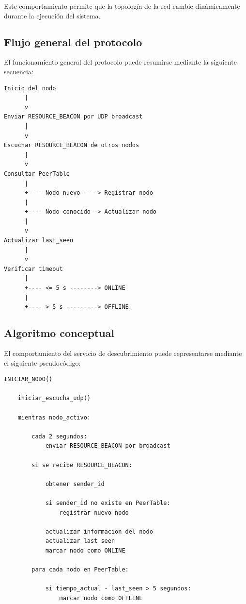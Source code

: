 \documentclass{article}
\begin{document}
Este comportamiento permite que la topología de la red cambie dinámicamente durante la ejecución del sistema.

\subsection{Flujo general del protocolo}

El funcionamiento general del protocolo puede resumirse mediante la siguiente secuencia:

\begin{lstlisting}[caption={Flujo general del protocolo de descubrimiento}]
Inicio del nodo
      |
      v
Enviar RESOURCE_BEACON por UDP broadcast
      |
      v
Escuchar RESOURCE_BEACON de otros nodos
      |
      v
Consultar PeerTable
      |
      +---- Nodo nuevo ----> Registrar nodo
      |
      +---- Nodo conocido -> Actualizar nodo
      |
      v
Actualizar last_seen
      |
      v
Verificar timeout
      |
      +---- <= 5 s --------> ONLINE
      |
      +---- > 5 s ---------> OFFLINE
\end{lstlisting}

\subsection{Algoritmo conceptual}

El comportamiento del servicio de descubrimiento puede representarse mediante el siguiente pseudocódigo:

\begin{lstlisting}[caption={Pseudocódigo del protocolo de descubrimiento}]
INICIAR_NODO()

    iniciar_escucha_udp()

    mientras nodo_activo:

        cada 2 segundos:
            enviar RESOURCE_BEACON por broadcast

        si se recibe RESOURCE_BEACON:

            obtener sender_id

            si sender_id no existe en PeerTable:
                registrar nuevo nodo

            actualizar informacion del nodo
            actualizar last_seen
            marcar nodo como ONLINE

        para cada nodo en PeerTable:

            si tiempo_actual - last_seen > 5 segundos:
                marcar nodo como OFFLINE
\end{lstlisting}
\end{document}
